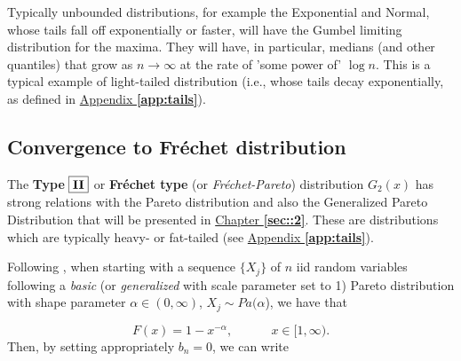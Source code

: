 \vspace{.2cm}
Typically unbounded distributions, for example the Exponential and Normal, whose tails fall off exponentially or faster, will have the Gumbel limiting distribution for the maxima. They will have, in particular, medians (and other quantiles) that grow as $n\rightarrow\infty$ at the rate
of 'some power of' $\log n$. This is a typical example of light-tailed distribution (i.e., whose tails decay exponentially, as defined in \hyperref[app:tails]{Appendix \textbf{\ref{app:tails}}}).

\vspace{-.3cm}
\subsection*{Convergence to Fréchet distribution}

The \textbf{Type}  $\boxed{\textbf{\text{II}}}$ or \textbf{Fréchet type} (or \emph{Fréchet-Pareto}) distribution $G_2(x)$ has strong relations with the Pareto distribution and also the Generalized Pareto Distribution that will be presented in \hyperref[sec::2]{Chapter \textbf{\ref{sec::2}}}. These are distributions which are typically heavy- or fat-tailed (see \hyperref[app:tails]{Appendix \textbf{\ref{app:tails}}}).

Following \citet{beirlant_practical_1996}, when starting with a sequence $\{X_j\}$ of $n$ iid random variables following a \textit{basic} (or \textit{generalized} with scale parameter set to 1) Pareto distribution with shape parameter $\alpha\in (0,\infty)$, $X_j\sim Pa(\alpha$), we have that 

\begin{equation}
F(x)=1-x^{-\alpha}, \ \ \ \ \ \ \ \ \ \ \ \ \ \ x\in[1,\infty).
\end{equation}
Then, by setting appropriately $b_n=0$, we can write

